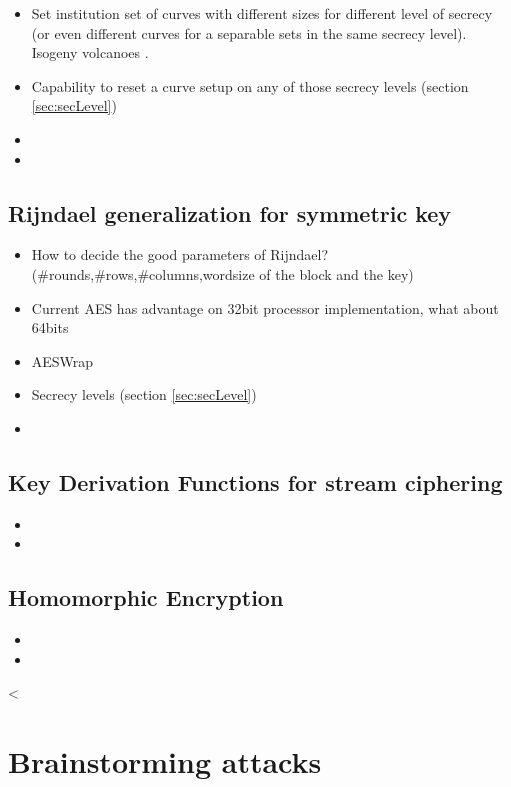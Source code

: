 \documentclass[10pt,a4paper,twoside]{llncs}
\begin{document}
\begin{itemize}
 \item Set institution set of curves with different sizes for different level of secrecy (or even different curves for a separable sets in the same secrecy level). Isogeny volcanoes \cite{secRickShareECs}.
 \item Capability to reset a curve setup on any of those secrecy levels (section \ref{sec:secLevel})
 \item 
 \item 
\end{itemize}

%
\subsection{Rijndael generalization for symmetric key \label{sec:gRijndael}}

\begin{itemize}
 \item How to decide the good parameters of Rijndael? (\#rounds,\#rows,\#columns,wordsize of the block and the key) \cite{gRijndael}
 \item Current AES has advantage on 32bit processor implementation, what about 64bits
 \item AESWrap \cite{rfc3394}
 \item Secrecy levels (section \ref{sec:secLevel})
 \item 
\end{itemize}

%
\subsection{Key Derivation Functions for stream ciphering \label{sec:kdfStreaming}}

\begin{itemize}
 \item 
 \item 
\end{itemize}

%
\subsection{Homomorphic Encryption \label{sec:Homorph}}
\begin{itemize}
 \item 
 \item 
\end{itemize}
<
%
\section{Brainstorming attacks \label{sec:attacks}}
\end{document}
